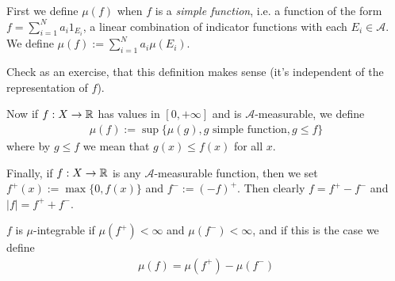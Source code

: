 \documentclass[a4paper]{article}
\begin{document}
First we define $\mu(f)$ when $f$ is a \emph{simple function}, i.e. a function of the form $f=\sum_{i=1}^N a_i 1_{E_i}$, a linear combination of indicator functions with each $E_i \in \mathcal{A}$. We define $\mu(f) := \sum_{i=1}^N a_i \mu(E_i)$.

Check as an exercise, that this definition makes sense (it's independent of the representation of $f$).

Now if $f:X \to \mathbb{R}$ has values in $[0,+\infty]$ and is $\mathcal{A}$-measurable, we define
\begin{equation*}
\begin{aligned}
\mu(f) := \sup \{ \mu(g), g \text{ simple function}, g \leq f\}
\end{aligned}
\end{equation*}
where by $g\leq f$ we mean that $g(x)\leq f(x)$ for all $x$.

Finally, if $f:X \to \mathbb{R}$ is any $\mathcal{A}$-measurable function, then we set $f^+(x) := \max \{0,f(x)\}$ and $f^-:=(-f)^+$. Then clearly $f = f^+ - f^-$ and $|f| = f^+ + f^-$.

\begin{defi}
$f$ is $\mu$-integrable if $\mu(f^+) < \infty$ and $\mu(f^-) < \infty$, and if this is the case we define
\begin{equation*}
\begin{aligned}
\mu(f) = \mu(f^+) - \mu(f^-)
\end{aligned}
\end{equation*}
\end{defi}
\end{document}
